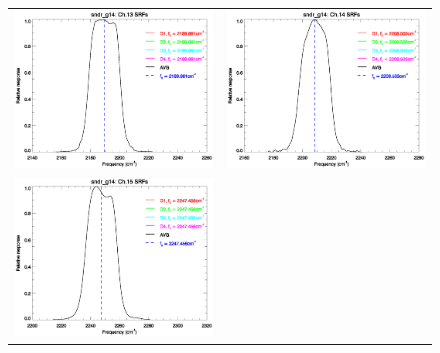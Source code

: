 \begin{figure}[htp]
  \centering
  \begin{tabular}{c c}
    \includegraphics[scale=0.5]{graphics/nominal/sndr_g14.ch13.srf.eps} &
    \includegraphics[scale=0.5]{graphics/nominal/sndr_g14.ch14.srf.eps} \\
    \includegraphics[scale=0.5]{graphics/nominal/sndr_g14.ch15.srf.eps} &

\end{tabular}
\end{figure}
